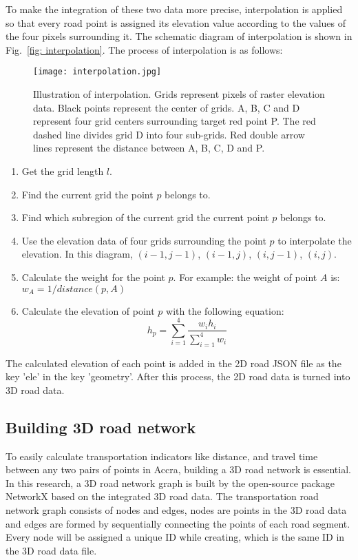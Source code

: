 \documentclass[final-report]{report-template}
\begin{document}
To make the integration of these two data more precise, interpolation is applied so that every road point is assigned its elevation value according to the values of the four pixels surrounding it.
The schematic diagram of interpolation is shown in Fig.~\ref{fig: interpolation}. The process of interpolation is as follows:
\begin{figure}[H]
    \centering
    \texttt{[image: interpolation.jpg]}
    \caption{Illustration of interpolation. Grids represent pixels of raster elevation data. Black points represent the center of grids. A, B, C and D represent four grid centers surrounding target red point P. The red dashed line divides grid D into four sub-grids. Red double arrow lines represent the distance between A, B, C, D and P.}
    \label{fig:interpolation}
\end{figure}

\begin{enumerate}
    \item Get the grid length $l$.
    \item Find the current grid the point $p$ belongs to.
    \item Find which subregion of the current grid the current point $p$ belongs to.
    \item Use the elevation data of four grids surrounding the point $p$ to interpolate the elevation. In this diagram, $(i-1,j-1)$, $(i-1,j)$, $(i,j-1)$, $(i,j)$.
    \item Calculate the weight for the point $p$. For example: the weight of point $A$ is: $w_A = 1/distance(p, A)$
    \item Calculate the elevation of point $p$ with the following equation:
    \begin{equation}
        h_p = \sum_{i=1}^{4}\frac{w_i h_i}{\sum_{i=1}^{4} w_i}
    \end{equation}
\end{enumerate}

The calculated elevation of each point is added in the 2D road JSON file as the key 'ele' in the key 'geometry'.
After this process, the 2D road data is turned into 3D road data.

\subsection{Building 3D road network}
To easily calculate transportation indicators like distance, and travel time between any two pairs of points in Accra, building a 3D road network is essential.
In this research, a 3D road network graph is built by the open-source package NetworkX based on the integrated 3D road data.
The transportation road network graph consists of nodes and edges, nodes are points in the 3D road data and edges are formed by sequentially connecting the points of each road segment.   
Every node will be assigned a unique ID while creating, which is the same ID in the 3D road data file.
\end{document}

